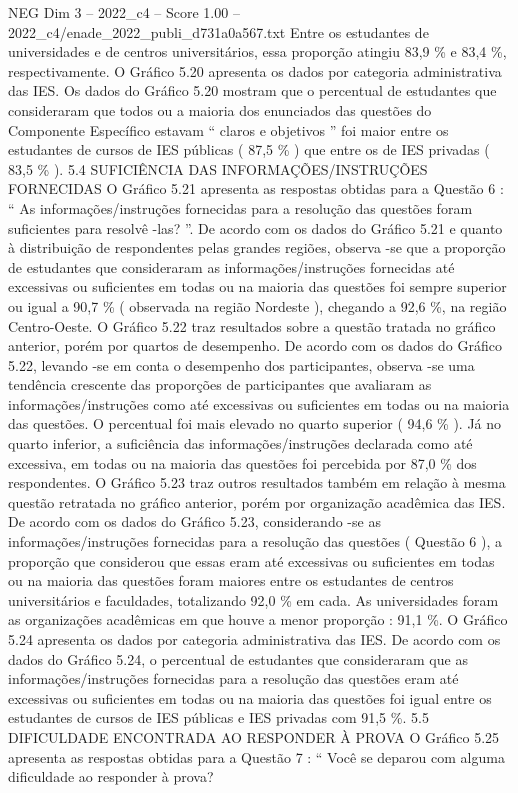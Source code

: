\begin{textsample}{NEG Dim 3 – 2022\_c4 – Score 1.00 – 2022\_c4/enade\_2022\_publi\_d731a0a567.txt}
Entre os estudantes de universidades e de centros universitários, essa proporção atingiu 83,9 \% e 83,4 \%, respectivamente.
O Gráfico 5.20 apresenta os dados por categoria administrativa das IES.
Os dados do Gráfico 5.20 mostram que o percentual de estudantes que consideraram que todos ou a maioria dos enunciados das questões do Componente Específico estavam “ claros e objetivos ” foi maior entre os estudantes de cursos de IES públicas ( 87,5 \% ) que entre os de IES privadas ( 83,5 \% ). 5.4 SUFICIÊNCIA DAS INFORMAÇÕES/INSTRUÇÕES FORNECIDAS O Gráfico 5.21 apresenta as respostas obtidas para a Questão 6 : “ As informações/instruções fornecidas para a resolução das questões foram suficientes para resolvê -las? ”.
De acordo com os dados do Gráfico 5.21 e quanto à distribuição de respondentes pelas grandes regiões, observa -se que a proporção de estudantes que consideraram as informações/instruções fornecidas até excessivas ou suficientes em todas ou na maioria das questões foi sempre superior ou igual a 90,7 \% ( observada na região Nordeste ), chegando a 92,6 \%, na região Centro-Oeste.
O Gráfico 5.22 traz resultados sobre a questão tratada no gráfico anterior, porém por quartos de desempenho.
De acordo com os dados do Gráfico 5.22, levando -se em conta o desempenho dos participantes, observa -se uma tendência crescente das proporções de participantes que avaliaram as informações/instruções como até excessivas ou suficientes em todas ou na maioria das questões.
O percentual foi mais elevado no quarto superior ( 94,6 \% ).
Já no quarto inferior, a suficiência das informações/instruções declarada como até excessiva, em todas ou na maioria das questões foi percebida por 87,0 \% dos respondentes.
O Gráfico 5.23 traz outros resultados também em relação à mesma questão retratada no gráfico anterior, porém por organização acadêmica das IES.
De acordo com os dados do Gráfico 5.23, considerando -se as informações/instruções fornecidas para a resolução das questões ( Questão 6 ), a proporção que considerou que essas eram até excessivas ou suficientes em todas ou na maioria das questões foram maiores entre os estudantes de centros universitários e faculdades, totalizando 92,0 \% em cada.
As universidades foram as organizações acadêmicas em que houve a menor proporção : 91,1 \%.
O Gráfico 5.24 apresenta os dados por categoria administrativa das IES.
De acordo com os dados do Gráfico 5.24, o percentual de estudantes que consideraram que as informações/instruções fornecidas para a resolução das questões eram até excessivas ou suficientes em todas ou na maioria das questões foi igual entre os estudantes de cursos de IES públicas e IES privadas com 91,5 \%. 5.5 DIFICULDADE ENCONTRADA AO RESPONDER À PROVA O Gráfico 5.25 apresenta as respostas obtidas para a Questão 7 : “ Você se deparou com alguma dificuldade ao responder à prova?

\end{textsample}
